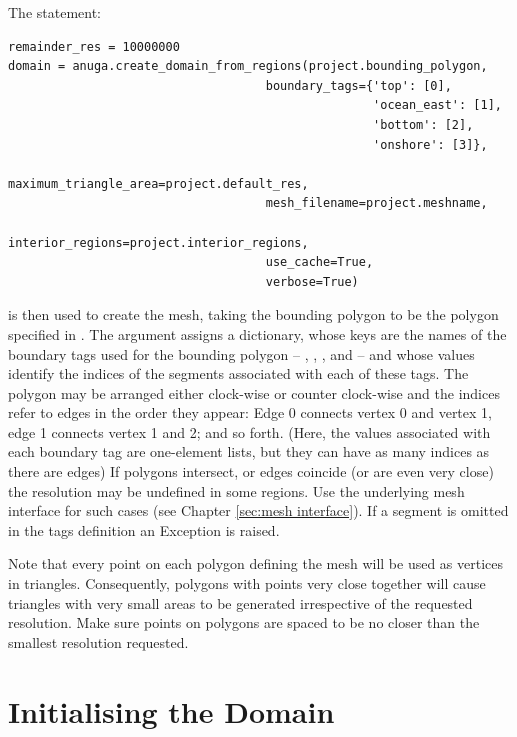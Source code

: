 \documentclass{manual}
\begin{document}
The statement:

\begin{verbatim}
remainder_res = 10000000
domain = anuga.create_domain_from_regions(project.bounding_polygon,
                                    boundary_tags={'top': [0],
                                                   'ocean_east': [1],
                                                   'bottom': [2],
                                                   'onshore': [3]},
                                    maximum_triangle_area=project.default_res,
                                    mesh_filename=project.meshname,
                                    interior_regions=project.interior_regions,
                                    use_cache=True,
                                    verbose=True)
\end{verbatim}

is then used to create the mesh, taking the bounding polygon to be
the polygon  specified in .
The argument  assigns a dictionary, whose keys
are the names of the boundary tags used for the bounding
polygon -- , , , and
 -- and whose values identify the indices of the
segments associated with each of these tags.
The polygon may be arranged either clock-wise or counter clock-wise and the
indices refer to edges in the order they appear: Edge 0 connects vertex 0 and vertex 1, edge 1 connects vertex 1 and 2; and so forth.
(Here, the values associated with each boundary tag are one-element lists, but they can have as many indices as there are edges)
If polygons intersect, or edges coincide (or are even very close) the resolution may be undefined in some regions.
Use the underlying mesh interface for such cases
(see Chapter \ref{sec:mesh interface}).
If a segment is omitted in the tags definition an Exception is raised.

Note that every point on each polygon defining the mesh will be used as vertices in triangles.
Consequently, polygons with points very close together will cause triangles with very small
areas to be generated irrespective of the requested resolution.
Make sure points on polygons are spaced to be no closer than the smallest resolution requested.

\section{Initialising the Domain}
\end{document}
